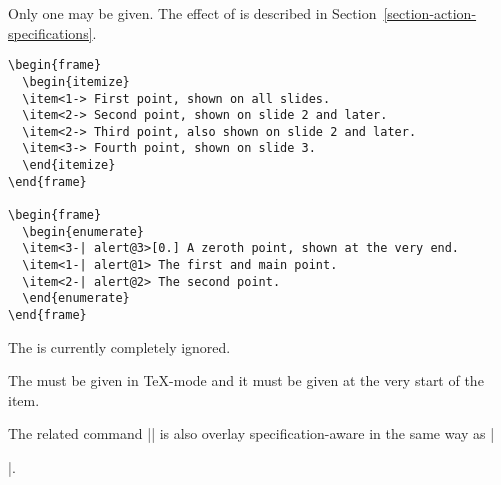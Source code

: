 \begin{command}{\item{}}
  \beamernote
  Only one  may be given. The effect of  is described in Section~\ref{section-action-specifications}.

  \example
\begin{verbatim}
\begin{frame}
  \begin{itemize}
  \item<1-> First point, shown on all slides.
  \item<2-> Second point, shown on slide 2 and later.
  \item<2-> Third point, also shown on slide 2 and later.
  \item<3-> Fourth point, shown on slide 3.
  \end{itemize}
\end{frame}

\begin{frame}
  \begin{enumerate}
  \item<3-| alert@3>[0.] A zeroth point, shown at the very end.
  \item<1-| alert@1> The first and main point.
  \item<2-| alert@2> The second point.
  \end{enumerate}
\end{frame}
\end{verbatim}

  \articlenote
  The  is currently completely ignored.

  \lyxnote
  The  must be given in \TeX-mode and it must be given at the very start of the item.
\end{command}

The related command |\bibitem| is also overlay specification-aware in the same way as |\item|.

